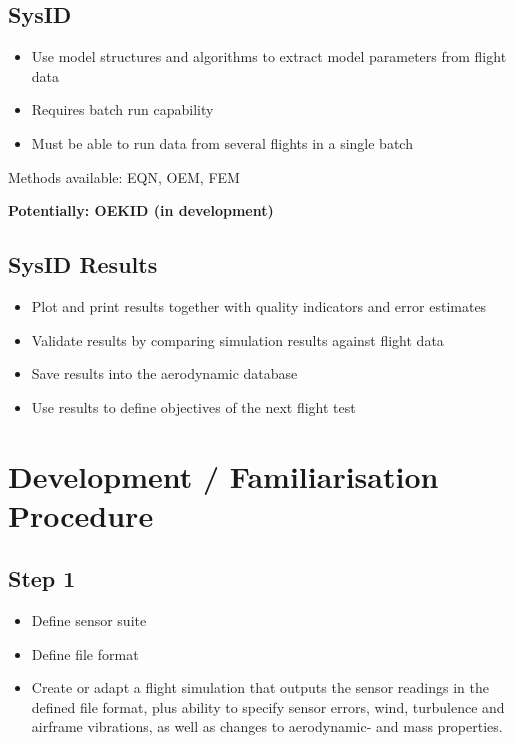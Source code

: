 \documentclass[11pt,a4paper]{article}
\begin{document}
\subsection{SysID}

\begin{itemize}
\item Use model structures and algorithms to extract model parameters from flight data
\item Requires batch run capability
\item Must be able to run data from several flights in a single batch
\end{itemize}

Methods available: EQN, OEM, FEM

\textbf{Potentially: OEKID (in development)}

\subsection{SysID Results}

\begin{itemize}
\item Plot and print results together with quality indicators and error estimates
\item Validate results by comparing simulation results against flight data
\item Save results into the aerodynamic database
\item Use results to define objectives of the next flight test
\end{itemize}

\clearpage
\section{Development / Familiarisation Procedure}

\subsection{Step 1}

\begin{itemize}
\item Define sensor suite
\item Define file format
\item Create or adapt a flight simulation that outputs the sensor readings in the defined file format, plus ability to specify sensor errors, wind, turbulence and airframe vibrations, as well as changes to aerodynamic- and mass properties.
\end{itemize}
\end{document}
